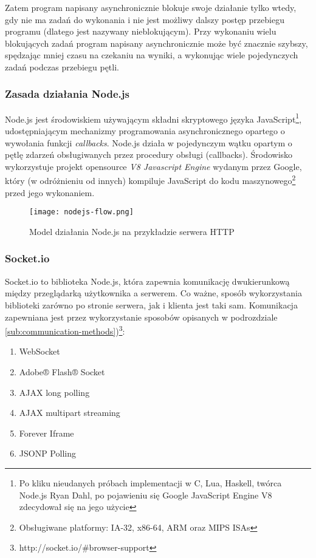 Zatem program napisany asynchronicznie blokuje swoje działanie tylko wtedy, gdy nie ma zadań do wykonania i nie jest możliwy dalszy postęp przebiegu programu (dlatego jest nazywany nieblokującym). Przy wykonaniu wielu blokujących zadań program napisany asynchronicznie może być znacznie szybszy, spędzając mniej czasu na czekaniu na wyniki, a wykonując wiele pojedynczych zadań podczas przebiegu pętli.

\subsubsection{Zasada działania Node.js}
\label{sub:tool-server-nodejs}

Node.js jest środowiskiem używającym składni skryptowego języka JavaScript\footnote{Po kliku nieudanych próbach implementacji w C, Lua,  Haskell, twórca Node.js Ryan Dahl, po pojawieniu się Google JavaScript Engine V8 zdecydował się na jego użycie}, udostępniającym mechanizmy programowania asynchronicznego opartego o wywołania funkcji \mbox{\emph{callbacks}}. Node.js działa w pojedynczym wątku opartym o pętlę zdarzeń obsługiwanych przez procedury obsługi (callbacks). Środowisko wykorzystuje projekt opensource \emph{V8 Javascript Engine} wydanym przez Google, który (w odróżnieniu od innych) kompiluje JavaScript do kodu maszynowego\footnote{Obsługiwane platformy: IA-32, x86-64, ARM oraz MIPS ISAs} przed jego wykonaniem.

\begin{figure}[H]
  \caption[Model działania Node.js]{Model działania Node.js na przykładzie serwera HTTP}
  \centering
    \texttt{[image: nodejs-flow.png]}
\end{figure}

\subsubsection{Socket.io}
\label{subsub:socketio}

Socket.io to biblioteka Node.js, która zapewnia komunikację dwukierunkową między przeglądarką użytkownika a serwerem. Co ważne, sposób wykorzystania biblioteki zarówno po stronie serwera, jak i klienta jest taki sam. Komunikacja zapewniana jest przez wykorzystanie sposobów opisanych w podrozdziale \ref{sub:communication-methods})\footnote{http://socket.io/\#browser-support}:

\begin{enumerate}
  \item WebSocket
  \item Adobe® Flash® Socket
  \item AJAX long polling
  \item AJAX multipart streaming
  \item Forever Iframe
  \item JSONP Polling
\end{enumerate}

